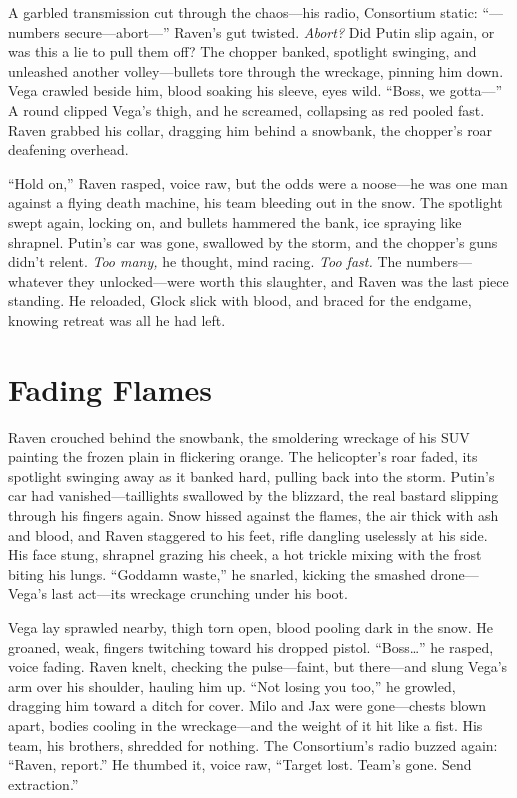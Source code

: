 \documentclass[12pt]{book}
\begin{document}
A garbled transmission cut through the chaos—his radio, Consortium static: “—numbers secure—abort—” Raven’s gut twisted. \textit{Abort?} Did Putin slip again, or was this a lie to pull them off? The chopper banked, spotlight swinging, and unleashed another volley—bullets tore through the wreckage, pinning him down. Vega crawled beside him, blood soaking his sleeve, eyes wild. “Boss, we gotta—” A round clipped Vega’s thigh, and he screamed, collapsing as red pooled fast. Raven grabbed his collar, dragging him behind a snowbank, the chopper’s roar deafening overhead.

“Hold on,” Raven rasped, voice raw, but the odds were a noose—he was one man against a flying death machine, his team bleeding out in the snow. The spotlight swept again, locking on, and bullets hammered the bank, ice spraying like shrapnel. Putin’s car was gone, swallowed by the storm, and the chopper’s guns didn’t relent. \textit{Too many,} he thought, mind racing. \textit{Too fast.} The numbers—whatever they unlocked—were worth this slaughter, and Raven was the last piece standing. He reloaded, Glock slick with blood, and braced for the endgame, knowing retreat was all he had left.

\section{Fading Flames}

Raven crouched behind the snowbank, the smoldering wreckage of his SUV painting the frozen plain in flickering orange. The helicopter’s roar faded, its spotlight swinging away as it banked hard, pulling back into the storm. Putin’s car had vanished—taillights swallowed by the blizzard, the real bastard slipping through his fingers again. Snow hissed against the flames, the air thick with ash and blood, and Raven staggered to his feet, rifle dangling uselessly at his side. His face stung, shrapnel grazing his cheek, a hot trickle mixing with the frost biting his lungs. “Goddamn waste,” he snarled, kicking the smashed drone—Vega’s last act—its wreckage crunching under his boot.

Vega lay sprawled nearby, thigh torn open, blood pooling dark in the snow. He groaned, weak, fingers twitching toward his dropped pistol. “Boss…” he rasped, voice fading. Raven knelt, checking the pulse—faint, but there—and slung Vega’s arm over his shoulder, hauling him up. “Not losing you too,” he growled, dragging him toward a ditch for cover. Milo and Jax were gone—chests blown apart, bodies cooling in the wreckage—and the weight of it hit like a fist. His team, his brothers, shredded for nothing. The Consortium’s radio buzzed again: “Raven, report.” He thumbed it, voice raw, “Target lost. Team’s gone. Send extraction.”
\end{document}
